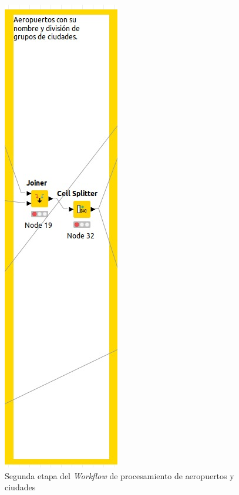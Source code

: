 \documentclass{article}
\begin{document}
\begin{landscape}
\begin{figure}
        \includegraphics[scale=0.5]{images/workflow_ciudades_2.jpeg}
        \caption{Segunda etapa del \textit{Workflow} de procesamiento de aeropuertos y ciudades}
        \label{fig:workflow_aeropuertos_ciudades_2}
    \end{figure}
    \newpage
    \begin{figure}
        \centering

\end{figure}
\end{landscape}
\end{document}
